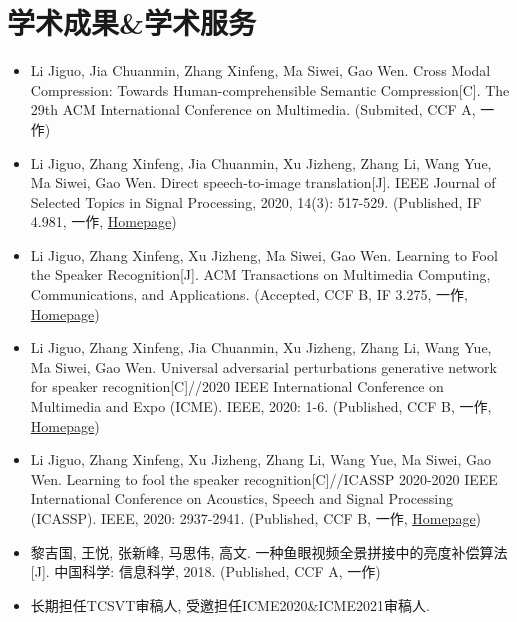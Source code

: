 \documentclass{resume}
\begin{document}

\section{学术成果\&学术服务}
\begin{itemize}
  \item Li Jiguo, Jia Chuanmin, Zhang Xinfeng, Ma Siwei, Gao Wen. Cross Modal Compression: Towards Human-comprehensible Semantic Compression[C]. The 29th ACM International Conference on Multimedia. (Submited, CCF A, 一作)
  \item Li Jiguo, Zhang Xinfeng, Jia Chuanmin, Xu Jizheng, Zhang Li, Wang Yue, Ma Siwei, Gao Wen. Direct speech-to-image translation[J]. IEEE Journal of Selected Topics in Signal Processing, 2020, 14(3): 517-529. (Published, IF 4.981, 一作, \href{https://smallflyingpig.github.io/speech-to-image/main}{Homepage})
  \item Li Jiguo, Zhang Xinfeng, Xu Jizheng, Ma Siwei, Gao Wen. Learning to Fool the Speaker Recognition[J]. ACM Transactions on Multimedia Computing, Communications, and Applications. (Accepted, CCF B, IF 3.275, 一作, \href{https://smallflyingpig.github.io/speaker-recognition-attacker/main}{Homepage})
  \item Li Jiguo, Zhang Xinfeng, Jia Chuanmin, Xu Jizheng, Zhang Li, Wang Yue, Ma Siwei, Gao Wen. Universal adversarial perturbations generative network for speaker recognition[C]//2020 IEEE International Conference on Multimedia and Expo (ICME). IEEE, 2020: 1-6. (Published, CCF B, 一作, \href{https://smallflyingpig.github.io/UAPs_for_speaker_recognition/main}{Homepage})
  \item Li Jiguo, Zhang Xinfeng, Xu Jizheng, Zhang Li, Wang Yue, Ma Siwei, Gao Wen. Learning to fool the speaker recognition[C]//ICASSP 2020-2020 IEEE International Conference on Acoustics, Speech and Signal Processing (ICASSP). IEEE, 2020: 2937-2941. (Published, CCF B, 一作, \href{https://smallflyingpig.github.io/speaker-recognition-attacker/main}{Homepage})
  \item 黎吉国, 王悦, 张新峰, 马思伟, 高文. 一种鱼眼视频全景拼接中的亮度补偿算法[J]. 中国科学: 信息科学, 2018. (Published, CCF A, 一作)
  \item 长期担任TCSVT审稿人, 受邀担任ICME2020\&ICME2021审稿人.
\end{itemize}
\end{document}
